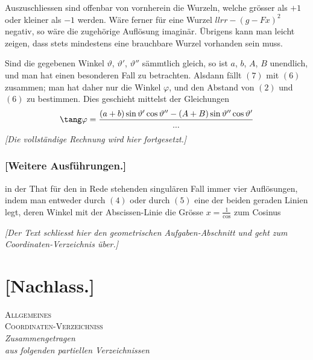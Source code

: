 \documentclass[12pt,a4paper]{article}
\begin{document}
Auszuschliessen sind offenbar von vornherein die Wurzeln, welche gr\"osser
als $+1$ oder kleiner als $-1$ werden. W\"are ferner f\"ur eine Wurzel $llrr - (g-Fx)^2$
negativ, so w\"are die zugeh\"orige Aufl\"osung imagin\"ar. \"Ubrigens kann man leicht
zeigen, dass stets mindestens eine brauchbare Wurzel vorhanden sein muss.

Sind die gegebenen Winkel $\vartheta$, $\vartheta'$, $\vartheta''$ s\"ammtlich gleich, so ist $a$, $b$, $A$, $B$
unendlich, und man hat einen besonderen Fall zu betrachten. Alsdann f\"allt
$(7)$ mit $(6)$ zusammen; man hat daher nur die Winkel $\varphi$, und den Abstand
von $(2)$ und $(6)$ zu bestimmen. Dies geschieht mittelst der Gleichungen
\[
\tang\varphi = \frac{(a+b)\sin\vartheta'\cos\vartheta'' - (A+B)\sin\vartheta''\cos\vartheta'}{...}
\]
\textit{[Die vollst\"andige Rechnung wird hier fortgesetzt.]}

\newpage
\subsubsection*{[Weitere Ausf\"uhrungen.]}

in der That f\"ur den in Rede stehenden singul\"aren Fall immer vier Aufl\"osungen,
indem man entweder durch $(4)$ oder durch $(5)$ eine der beiden geraden Linien
legt, deren Winkel mit der Abscissen-Linie die Gr\"osse $x = \frac{1}{\cos}$ zum Cosinus

\textit{[Der Text schliesst hier den geometrischen Aufgaben-Abschnitt und geht zum}
\textit{Coordinaten-Verzeichnis \"uber.]}

\newpage
\section*{[Nachlass.]}

\begin{center}
\Large\textsc{Allgemeines}\\[4pt]
\Large\textsc{Coordinaten-Verzeichniss}\\[8pt]
\normalsize
\textit{Zusammengetragen}\\
\textit{aus folgenden partiellen Verzeichnissen}
\end{center}
\end{document}
